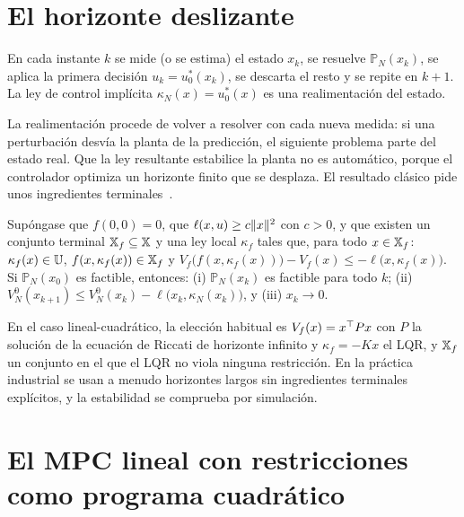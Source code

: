 \addtocounter{definicion}{1}%

\section{El horizonte deslizante}

\begin{definicion}\label{def:mpc}
En cada instante $k$ se mide (o se estima) el estado $x_k$, se resuelve $\mathbb P_N(x_k)$, se aplica la primera decisión $u_k=u_0^{*}(x_k)$, se descarta el resto y se repite en $k+1$. La ley de control implícita $\kappa_N(x)=u_0^{*}(x)$ es una realimentación del estado.
\end{definicion}

\addtocounter{figure}{1}%

La realimentación procede de volver a resolver con cada nueva medida: si una perturbación desvía la planta de la predicción, el siguiente problema parte del estado real. Que la ley resultante estabilice la planta no es automático, porque el controlador optimiza un horizonte finito que se desplaza. El resultado clásico pide unos ingredientes terminales~\cite[cap.~2]{rmd}.

\begin{teorema}\label{teo:mpc}
Supóngase que $f(0,0)=0$, que $\ell(x,u)\ge c\lVert x\rVert^{2}$ con $c>0$, y que existen un conjunto terminal $\mathbb{X}_f\subseteq\mathbb{X}$ y una ley local $\kappa_f$ tales que, para todo $x\in\mathbb{X}_f$: $\kappa_f(x)\in\mathbb{U}$, $f(x,\kappa_f(x))\in\mathbb{X}_f$ y $V_f\bigl(f(x,\kappa_f(x))\bigr)-V_f(x)\le-\ell\bigl(x,\kappa_f(x)\bigr)$. Si $\mathbb P_N(x_0)$ es factible, entonces: (i) $\mathbb P_N(x_k)$ es factible para todo $k$; (ii) $V_N^{0}(x_{k+1})\le V_N^{0}(x_k)-\ell\bigl(x_k,\kappa_N(x_k)\bigr)$, y (iii) $x_k\to0$.
\end{teorema}

En el caso lineal-cuadrático, la elección habitual es $V_f(x)=x^{\top} Px$ con $P$ la solución de la ecuación de Riccati de horizonte infinito y $\kappa_f=-Kx$ el LQR, y $\mathbb{X}_f$ un conjunto en el que el LQR no viola ninguna restricción. En la práctica industrial se usan a menudo horizontes largos sin ingredientes terminales explícitos, y la estabilidad se comprueba por simulación.

\section{El MPC lineal con restricciones como programa cuadrático}

